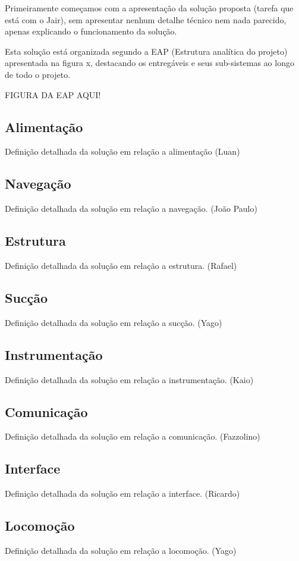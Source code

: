 Primeiramente começamos com a apresentação da solução proposta (tarefa que está com o Jair), sem apresentar nenhum detalhe técnico nem nada parecido, apenas explicando o funcionamento da solução. 

Esta solução está organizada segundo a EAP (Estrutura analítica do projeto) apresentada na figura x, destacando os entregáveis e seus sub-sistemas ao longo de todo o projeto.

FIGURA DA EAP AQUI!

\subsection{Alimentação} %
\label{sub:alimentação}
	Definição detalhada da solução em relação a alimentação (Luan)

\subsection{Navegação} %
\label{sub:automação}
	Definição detalhada da solução em relação a navegação. (João Paulo)

\subsection{Estrutura} %
\label{sub:alimentação}
	Definição detalhada da solução em relação a estrutura. (Rafael)

\subsection{Sucção} %
\label{sub:aspirador}
	Definição detalhada da solução em relação a sucção. (Yago)

\subsection{Instrumentação} %
\label{sub:instrumentação}
	Definição detalhada da solução em relação a instrumentação. (Kaio)

\subsection{Comunicação} %
\label{sub:comunicação}
	Definição detalhada da solução em relação a comunicação. (Fazzolino)

\subsection{Interface} %
\label{sub:interface}
	Definição detalhada da solução em relação a interface. (Ricardo)

\subsection{Locomoção} %
\label{sub:locomoção}
	Definição detalhada da solução em relação a locomoção. (Yago)

